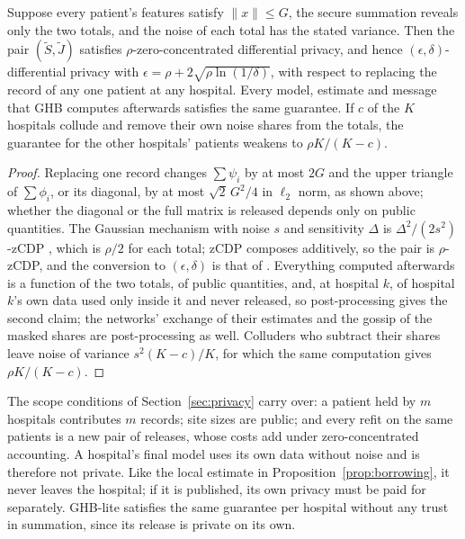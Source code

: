 \documentclass[acmsmall,screen,review]{acmart}
\theoremstyle{acmdefinition}
\begin{document}
\begin{proposition}\label{prop:ghbprivacy}
Suppose every patient's features satisfy $\|x\|\le G$, the secure summation reveals only the two totals, and the noise of each total has the stated variance. Then the pair $(\tilde{S},\tilde{J})$ satisfies $\rho$-zero-concentrated differential privacy, and hence $(\epsilon,\delta)$-differential privacy with $\epsilon=\rho+2\sqrt{\rho\ln(1/\delta)}$, with respect to replacing the record of any one patient at any hospital. Every model, estimate and message that GHB computes afterwards satisfies the same guarantee. If $c$ of the $K$ hospitals collude and remove their own noise shares from the totals, the guarantee for the other hospitals' patients weakens to $\rho K/(K-c)$.
\end{proposition}
\begin{proof}
Replacing one record changes $\sum\psi_i$ by at most $2G$ and the upper triangle of $\sum\phi_i$, or its diagonal, by at most $\sqrt2\,G^2/4$ in $\ell_2$ norm, as shown above; whether the diagonal or the full matrix is released depends only on public quantities. The Gaussian mechanism with noise $s$ and sensitivity $\Delta$ is $\Delta^2/(2s^2)$-zCDP \cite{bun2016concentrated}, which is $\rho/2$ for each total; zCDP composes additively, so the pair is $\rho$-zCDP, and the conversion to $(\epsilon,\delta)$ is that of \citet{bun2016concentrated}. Everything computed afterwards is a function of the two totals, of public quantities, and, at hospital $k$, of hospital $k$'s own data used only inside it and never released, so post-processing \cite{dwork2014algorithmic} gives the second claim; the networks' exchange of their estimates and the gossip of the masked shares are post-processing as well. Colluders who subtract their shares leave noise of variance $s^2(K-c)/K$, for which the same computation gives $\rho K/(K-c)$.
\end{proof}

The scope conditions of Section~\ref{sec:privacy} carry over: a patient held by $m$ hospitals contributes $m$ records; site sizes are public; and every refit on the same patients is a new pair of releases, whose costs add under zero-concentrated accounting. A hospital's final model uses its own data without noise and is therefore not private. Like the local estimate in Proposition~\ref{prop:borrowing}, it never leaves the hospital; if it is published, its own privacy must be paid for separately. GHB-lite satisfies the same guarantee per hospital without any trust in summation, since its release is private on its own.
\end{document}
